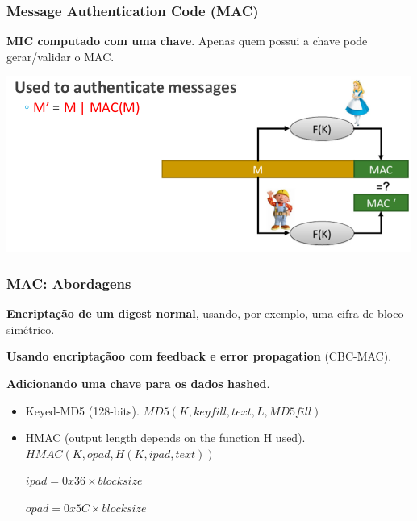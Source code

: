 \documentclass{article}
\begin{document}
\pagebreak

\subsubsection{Message Authentication Code (MAC)}

\begin{flushleft}
  \textbf{MIC computado com uma chave}. Apenas quem possui a chave pode
  gerar/validar o MAC.
\end{flushleft}

\begin{center}
  \includegraphics[scale=0.4]{97}
\end{center}


\subsubsection{MAC: Abordagens}

\begin{flushleft}
  \textbf{Encriptação de um digest normal}, usando, por exemplo, uma
  cifra de bloco simétrico.

  \vspace{2mm}

  \textbf{Usando encriptaçãoo com feedback e error propagation} (CBC-MAC).

  \textbf{Adicionando uma chave para os dados hashed}.
  \begin{itemize}
    \item Keyed-MD5 (128-bits). $MD5(K, keyfill, text, L, MD5fill)$
    \item HMAC (output length depends on the function H used).
    $HMAC(K, opad, H(K, ipad, text))$

    $ipad = 0x36 \times blocksize$

    $opad = 0x5C \times blocksize$
  \end{itemize}
\end{flushleft}
\end{document}
